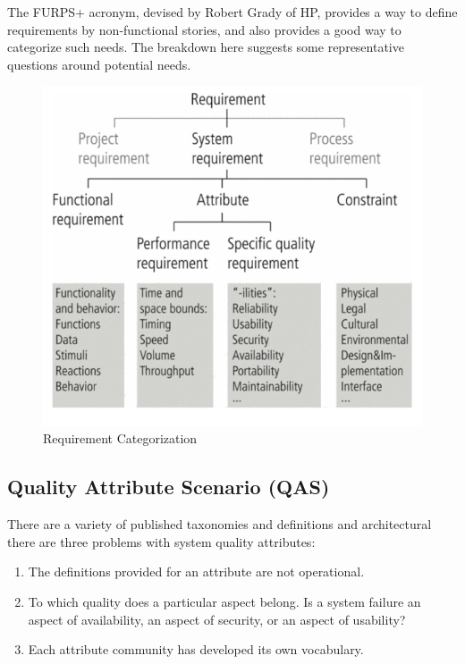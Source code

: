 \documentclass[../Main.tex]{subfiles}
\begin{document}
The FURPS+ acronym, devised by Robert Grady of HP, provides a way to define requirements by non-functional
stories, and also provides a good way to categorize such needs. The breakdown here suggests some representative
questions around potential needs.

\begin{figure}[H] 
    \centering
    \includegraphics[width=0.5\linewidth]{Images/req-categorization.png}
    \caption{Requirement Categorization}
\end{figure}

\newpage
\subsection{Quality Attribute Scenario (QAS)}
There are a variety of published taxonomies and definitions and 
architectural there are three problems with system quality attributes:
\begin{enumerate}
    \item The definitions provided for an attribute are not operational.
    \item To which quality does a particular aspect belong. Is a system failure an aspect
    of availability, an aspect of security, or an aspect of usability?
    \item Each attribute community has developed its own vocabulary.
\end{enumerate}
\end{document}
